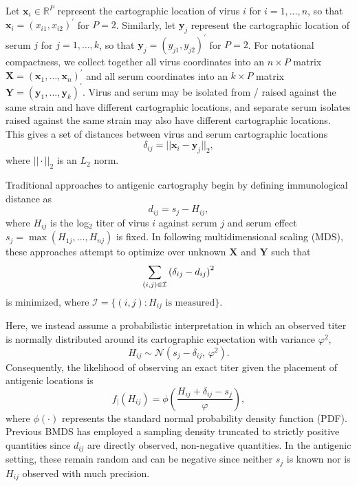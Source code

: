 \documentclass[11pt,oneside,letterpaper]{article}
\newcommand{\virus}{\mathbf{x}}						%
\newcommand{\serum}{\mathbf{y}}						%
\newcommand{\viruses}{\mathbf{X}}					%
\newcommand{\sera}{\mathbf{Y}}						%
\newcommand{\se}{s}									%
\newcommand{\point}{f_{\scriptscriptstyle \vert}}	%
\newcommand{\mdssd}{\varphi}						%
\newcommand{\vn}{n}									%
\newcommand{\sn}{k}									%
\newcommand{\normal}{\mathcal{N}}					%
\begin{document}
Let $\virus_i \in \mathbb{R}^{P}$ represent the cartographic location of virus $i$ for $i = 1,\ldots,\vn$, so that $\virus_i = (x_{i1}, x_{i2})^{\prime}$ for $P=2$. 
Similarly, let $\serum_j$ represent the cartographic location of serum $j$ for $j = 1,\ldots,\sn$, so that $\serum_j = (y_{j1},y_{j2})^{\prime}$ for $P=2$.
For notational compactness, we collect together all virus coordinates into an $\vn \times P$ matrix  $\viruses = (\virus_1, \ldots, \virus_{\vn})^{\prime}$ and all serum coordinates into an $\sn \times P$ matrix $\sera = (\serum_{1},\ldots,\serum_{\sn})^{\prime}$.
Virus and serum may be isolated from / raised against the same strain and have different cartographic locations, and separate serum isolates raised against the same strain may also have different cartographic locations. 
This gives a set of distances between virus and serum cartographic locations 
\begin{equation}
	\delta_{ij} =  || \virus_i - \serum_j ||_2,
\end{equation}
where $|| \cdot ||_2$ is an $L_2$ norm.

Traditional approaches to antigenic cartography \cite{Smith04} begin by defining immunological distance as
\begin{equation}
	d_{ij} =  \se_j - H_{ij},
\end{equation}
where $H_{ij}$ is the log$_2$ titer of virus $i$ against serum $j$ and serum effect $\se_j = \max ( H_{1j},\ldots,H_{\vn j} )$ is fixed.
In following multidimensional scaling (MDS), these approaches attempt to optimize over unknown $\viruses$ and $\sera$ such that
\begin{equation} \label{mds}
	\sum_{(i,j) \in \cal I} 
	\left(
		\delta_{ij} - d_{ij}
	\right)^2
\end{equation}
is minimized, where $\mathcal{I} = \{ (i,j) : H_{ij} \mbox{ is measured} \}$.

Here, we instead assume a probabilistic interpretation in which an observed titer is normally distributed around its cartographic expectation with variance $\mdssd^2$,
\begin{equation} \label{hij}
	H_{ij} \sim \normal( \se_j - \delta_{ij}, \, \mdssd^2 ).
\end{equation}
Consequently, the likelihood of observing an exact titer given the placement of antigenic locations is 
\begin{equation} 
	\point(H_{ij}) = \phi \left( \frac{ H_{ij} + \delta_{ij} - \se_j }{ \mdssd } \right),
\end{equation}
where $\phi(\cdot)$ represents the standard normal probability density function (PDF).
Previous BMDS has employed a sampling density truncated to strictly positive quantities since $d_{ij}$ are directly observed, non-negative quantities.  
In the antigenic setting, these remain random and can be negative since neither $\se_j$ is known nor is $H_{ij}$ observed with much precision. 
\end{document}
